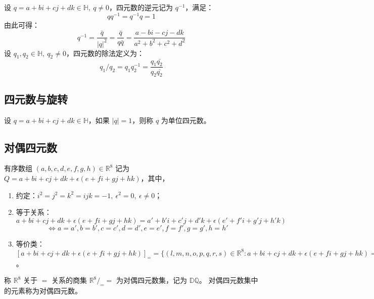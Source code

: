 \vspace{1em}

\begin{definition}[四元数的逆元与除法]
    设 $q = a + bi + cj + dk\in\mathbb{H},\ q \neq 0$，四元数的逆元记为 $q^{-1}$，满足：
    \[
        q q^{-1} = q^{-1} q = 1
    \]
    由此可得：
    \[
        q^{-1} = \frac{\bar{q}}{|q|^2} = \frac{\bar{q}}{q\bar{q}} = \frac{a - bi - cj - dk}{a^2 + b^2 + c^2 + d^2}
    \]
    设 $q_1, q_2\in\mathbb{H},\ q_2 \neq 0$，四元数的除法定义为：
    \[
        q_1 / q_2 = q_1 q_2^{-1} = \frac{q_1 \bar{q_2}}{q_2 \bar{q_2}}
    \]
\end{definition}
\vspace{1em}

\subsection{四元数与旋转}
\begin{definition}
    设 $q = a + bi + cj + dk\in\mathbb{H}$，如果 $|q| = 1$，则称 $q$ 为单位四元数。
\end{definition}



\subsection{对偶四元数}
\begin{definition}
    有序数组 $(a, b, c, d, e, f, g, h)\in\mathbb{R}^8$ 记为 $Q = a + bi + cj + dk + \epsilon(e + fi + gj + hk)$，其中，
    \begin{enumerate}
        \item 约定：$i^2 = j^2 = k^2 = ijk = -1,\ \epsilon^2 = 0,\ \epsilon \neq 0$；
        \item 等于关系：$a + bi + cj + dk + \epsilon(e + fi + gj + hk) = a' + b'i + c'j + d'k + \epsilon(e' + f'i + g'j + h'k)$
        \[
            \iff a = a', b = b', c = c', d = d', e = e', f = f', g = g', h = h'
        \]
        \item 等价类：$[a + bi + cj + dk + \epsilon(e + fi + gj + hk)]_{=}=\{(l,m,n,o,p,q,r,s)\in\mathbb{R}^8 : a + bi + cj + dk + \epsilon(e + fi + gj + hk) = l + mi + nj + ok + \epsilon(p + qi + rj + sk)\}$。
    \end{enumerate}
    称 $\mathbb{R}^8$ 关于 $=$ 关系的商集 $\mathbb{R}^8/_{=}=$ 为对偶四元数集，记为 $\mathbb{DQ}$。
    对偶四元数集中的元素称为对偶四元数。
    
\end{definition}


